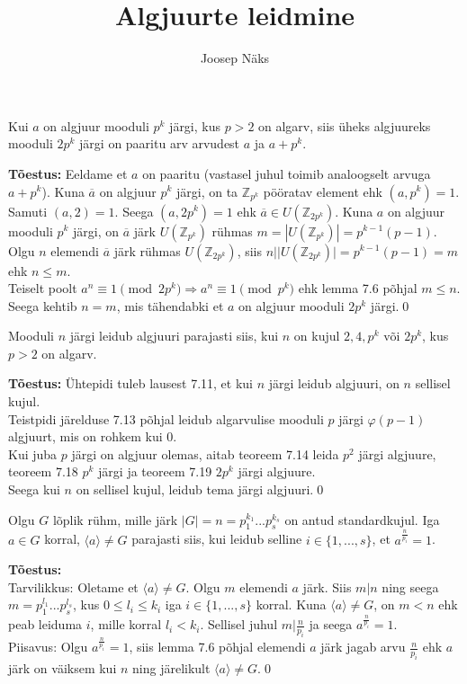 \documentclass{beamer}
\title{Algjuurte leidmine}
\author{Joosep Näks}
\institute{Tartu Ülikool}
\newcommand{\w}{\overline}
\newcommand{\Z}{\mathbb{Z}}
\begin{document}
\begin{frame} 
\titlepage
\end{frame}

\begin{frame}

\begin{theorem}[Teoreem 7.19]
  Kui $a$ on algjuur mooduli $p^k$ järgi, kus $p>2$ on algarv, siis üheks algjuureks mooduli $2p^k$ järgi on paaritu arv arvudest $a$ ja $a+p^k$.
\end{theorem}
\textbf{Tõestus:} Eeldame et $a$ on paaritu (vastasel juhul toimib analoogselt arvuga $a+p^k$). Kuna $\w{a}$ on algjuur $p^k$ järgi, on ta $\Z_{p^k}$ pööratav element ehk $(a,p^k)=1$. Samuti $(a,2)=1$. Seega $(a,2p^k)=1$ ehk $\w a\in U(\Z_{2p^k})$. Kuna $a$ on algjuur mooduli $p^k$ järgi, on $\w a$ järk $U(\Z_{p^k})$ rühmas $m=|U(\Z_{p^k})|=p^{k-1}(p-1)$. Olgu $n$ elemendi $\w a$ järk rühmas $U(\Z_{2p^k})$, siis $n||U(\Z_{2p^k})|=p^{k-1}(p-1)=m$ ehk $n\leq m$.\\ Teiselt poolt $a^n\equiv1\pmod{2p^k} \Rightarrow a^n\equiv1\pmod{p^k}$ ehk lemma 7.6 põhjal $m\leq n$. Seega kehtib $n=m$, mis tähendabki et $a$ on algjuur mooduli $2p^k$ järgi.\qed
\end{frame}

\begin{frame}
\begin{theorem}[Teoreem 7.21]
Mooduli $n$ järgi leidub algjuuri parajasti siis, kui $n$ on kujul $2, 4, p^k\text{ või } 2p^k$, kus $p>2$ on algarv.
\end{theorem}
\textbf{Tõestus:} Ühtepidi tuleb lausest 7.11, et kui $n$ järgi leidub algjuuri, on $n$ sellisel kujul.\\
Teistpidi järelduse 7.13 põhjal leidub algarvulise mooduli $p$ järgi $\varphi(p-1)$ algjuurt, mis on rohkem kui 0.\\
Kui juba $p$ järgi on algjuur olemas, aitab teoreem 7.14 leida $p^2$ järgi algjuure, teoreem 7.18 $p^k$ järgi ja teoreem 7.19 $2p^k$ järgi algjuure.\\
Seega kui $n$ on sellisel kujul, leidub tema järgi algjuuri.\qed
\end{frame}

\begin{frame}
\begin{theorem}[Lemma 7.22]
Olgu $G$ lõplik rühm, mille järk $|G|=n=p_1^{k_1}...p_s^{k_s}$ on antud standardkujul. Iga $a\in G$ korral, $\langle a\rangle\neq G$ parajasti siis, kui leidub selline $i\in\{1,...,s\}$, et $a^{\frac{n}{p_i}}=1$.
\end{theorem}
\textbf{Tõestus:}\\ Tarvilikkus: Oletame et $\langle a\rangle\neq G$. Olgu $m$ elemendi $a$ järk. Siis $m|n$ ning seega $m=p_1^{l_1}...p_s^{l_s}$, kus $0\leq l_i\leq k_i$ iga $i\in\{1,...,s\}$ korral. Kuna $\langle a\rangle\neq G$, on $m<n$ ehk peab leiduma $i$, mille korral $l_i<k_i$. Sellisel juhul $m|\frac{n}{p_i}$ ja seega $a^{\frac{n}{p_i}}=1$.\\
Piisavus: Olgu $a^{\frac{n}{p_i}}=1$, siis lemma 7.6 põhjal elemendi $a$ järk jagab arvu $\frac{n}{p_i}$ ehk $a$ järk on väiksem kui $n$ ning järelikult $\langle a\rangle \neq G$.\qed
\end{frame}
\end{document}
